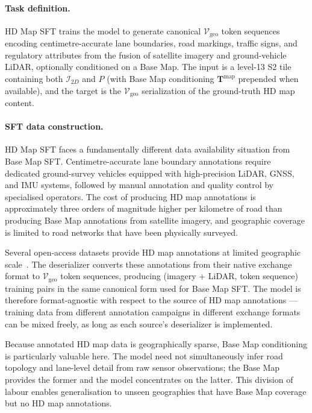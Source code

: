 \documentclass{book}
\begin{document}
\paragraph{Task definition.}

HD Map SFT trains the model to generate canonical
$\mathcal{V}_{\text{geo}}$ token sequences encoding
centimetre-accurate lane boundaries, road markings, traffic
signs, and regulatory attributes from the fusion of satellite
imagery and ground-vehicle LiDAR, optionally conditioned on
a Base Map.  The input is a level-13 S2 tile containing
both $\mathcal{I}_{2D}$ and $P$ (with Base Map conditioning
$\mathbf{T}^{\text{map}}$ prepended when available), and the
target is the $\mathcal{V}_{\text{geo}}$ serialization of
the ground-truth HD map content.

\paragraph{SFT data construction.}

HD Map SFT faces a fundamentally different data availability
situation from Base Map SFT.  Centimetre-accurate lane
boundary annotations require dedicated ground-survey
vehicles equipped with high-precision LiDAR, GNSS, and IMU
systems, followed by manual annotation and quality control
by specialised operators.  The cost of producing HD map
annotations is approximately three orders of magnitude
higher per kilometre of road than producing Base Map
annotations from satellite imagery, and geographic coverage
is limited to road networks that have been physically
surveyed.

Several open-access datasets provide HD map annotations at
limited geographic scale~\cite{caesar2020nuscenes,
nuplan2023}.  The deserializer converts these annotations
from their native exchange format to $\mathcal{V}_{\text{geo}}$
token sequences, producing (imagery + LiDAR, token sequence)
training pairs in the same canonical form used for Base Map
SFT.  The model is therefore format-agnostic with respect
to the source of HD map annotations --- training data from
different annotation campaigns in different exchange formats
can be mixed freely, as long as each source's deserializer
is implemented.

Because annotated HD map data is geographically sparse,
Base Map conditioning is particularly valuable here.  The
model need not simultaneously infer road topology and
lane-level detail from raw sensor observations; the Base Map
provides the former and the model concentrates on the latter.
This division of labour enables generalisation to unseen
geographies that have Base Map coverage but no HD map
annotations.
\end{document}
